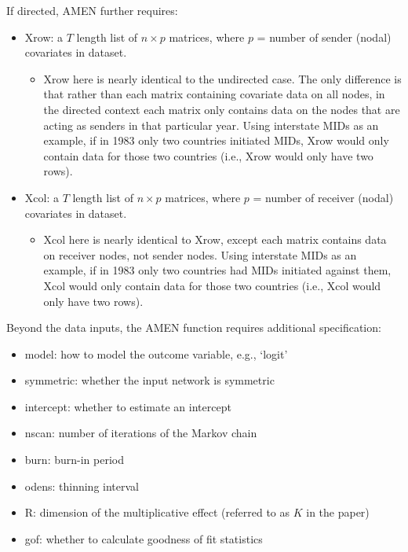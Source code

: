 \documentclass[12pt]{amsart}
\begin{document}
If directed, AMEN further requires:

\begin{itemize}[noitemsep,nolistsep]
    \item Xrow: a $T$ length list of $n\times p$ matrices, where $p$ = number of sender (nodal) covariates in dataset.
    \begin{itemize}
      \item Xrow here is nearly identical to the undirected case. The only difference is that rather than each matrix containing covariate data on all nodes, in the directed context each matrix only contains data on the nodes that are acting as senders in that particular year. Using interstate MIDs as an example, if in 1983 only two countries initiated MIDs, Xrow would only contain data for those two countries (i.e., Xrow would only have two rows).
    \end{itemize}
    \item Xcol: a $T$ length list of $n\times p$ matrices, where $p$ = number of receiver (nodal) covariates in dataset.
    \begin{itemize}
      \item Xcol here is nearly identical to Xrow, except each matrix contains data on receiver nodes, not sender nodes. Using interstate MIDs as an example, if in 1983 only two countries had MIDs initiated against them, Xcol would only contain data for those two countries (i.e., Xcol would only have two rows).
    \end{itemize}
\end{itemize}

Beyond the data inputs, the AMEN function requires additional specification:

\begin{itemize}
    \item model: how to model the outcome variable, e.g., `logit'
    \item symmetric: whether the input network is symmetric
    \item intercept: whether to estimate an intercept
    \item nscan: number of iterations of the Markov chain
    \item burn: burn-in period
    \item odens: thinning interval
    \item R: dimension of the multiplicative effect (referred to as $K$ in the paper)
    \item gof: whether to calculate goodness of fit statistics
\end{itemize}
\end{document}

